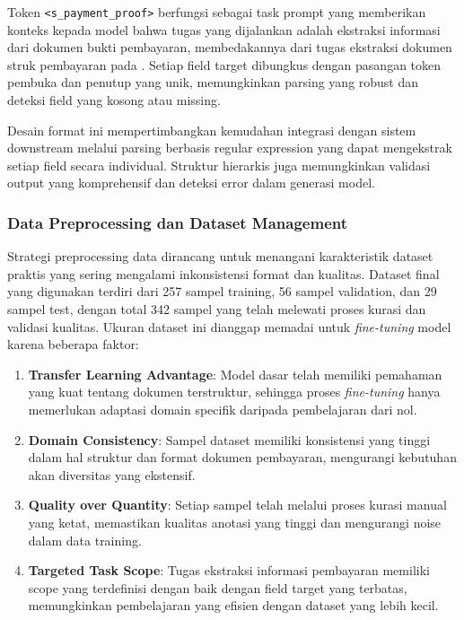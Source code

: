 Token \texttt{<s\_payment\_proof>} berfungsi sebagai task prompt yang memberikan konteks kepada model bahwa tugas yang dijalankan adalah ekstraksi informasi dari dokumen bukti pembayaran, membedakannya dari tugas ekstraksi dokumen struk pembayaran pada \donutcord. Setiap field target dibungkus dengan pasangan token pembuka dan penutup yang unik, memungkinkan parsing yang robust dan deteksi field yang kosong atau missing.

Desain format ini mempertimbangkan kemudahan integrasi dengan sistem downstream melalui parsing berbasis regular expression yang dapat mengekstrak setiap field secara individual. Struktur hierarkis juga memungkinkan validasi output yang komprehensif dan deteksi error dalam generasi model.

\subsubsection{Data Preprocessing dan Dataset Management}
\label{subsubsec:data-preprocessing}

Strategi preprocessing data dirancang untuk menangani karakteristik dataset praktis yang sering mengalami inkonsistensi format dan kualitas. Dataset final yang digunakan terdiri dari 257 sampel training, 56 sampel validation, dan 29 sampel test, dengan total 342 sampel yang telah melewati proses kurasi dan validasi kualitas. Ukuran dataset ini dianggap memadai untuk \emph{fine-tuning} model \donut{} karena beberapa faktor:

\begin{enumerate}
    \item \textbf{Transfer Learning Advantage}: Model dasar \donutcord{} telah memiliki pemahaman yang kuat tentang dokumen terstruktur, sehingga proses \emph{fine-tuning} hanya memerlukan adaptasi domain specifik daripada pembelajaran dari nol.
    \item \textbf{Domain Consistency}: Sampel dataset memiliki konsistensi yang tinggi dalam hal struktur dan format dokumen pembayaran, mengurangi kebutuhan akan diversitas yang ekstensif.
    \item \textbf{Quality over Quantity}: Setiap sampel telah melalui proses kurasi manual yang ketat, memastikan kualitas anotasi yang tinggi dan mengurangi noise dalam data training.
    \item \textbf{Targeted Task Scope}: Tugas ekstraksi informasi pembayaran memiliki scope yang terdefinisi dengan baik dengan field target yang terbatas, memungkinkan pembelajaran yang efisien dengan dataset yang lebih kecil.
\end{enumerate}


